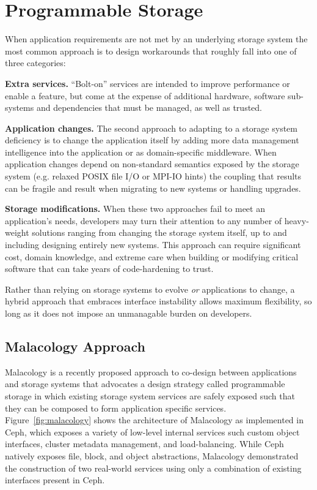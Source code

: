 \section{Programmable Storage}
\label{sec:progly}

When application requirements are not met by an underlying storage system the
most common approach is to design workarounds that roughly fall into one
of three categories:

{\bf Extra services.} ``Bolt-on'' services are intended to improve performance
or enable a feature, but come at the expense of additional hardware, software
sub-systems and dependencies that must be managed, as well as trusted.

{\bf Application changes.} The second approach to adapting to a storage system
deficiency is to change the application itself by adding more data management
intelligence into the application or as domain-specific middleware. When
application changes depend on non-standard semantics exposed by the storage
system (e.g. relaxed POSIX file I/O or MPI-IO hints) the coupling that results
can be fragile and result when migrating to new systems or handling upgrades.

{\bf Storage modifications.} When these two approaches fail to meet an
application's needs, developers may turn their attention to any number of
heavy-weight solutions ranging from changing the storage system itself, up to
and including designing entirely new systems. This approach can require
significant cost, domain knowledge, and extreme care when building or
modifying critical software that can take years of code-hardening to trust.

Rather than relying on storage systems to evolve \emph{or} applications to
change, a hybrid approach that embraces interface instability allows maximum
flexibility, so long as it does not impose an unmanagable burden on
developers.

\subsection{Malacology Approach}

Malacology is a recently proposed approach to co-design between applications
and storage systems that advocates a design strategy called programmable
storage in which existing storage system services are safely exposed such that
they can be composed to form application specific services.
Figure~\ref{fig:malacology} shows the architecture of Malacology as
implemented in Ceph, which exposes a variety of low-level internal services
such custom object interfaces, cluster metadata management, and
load-balancing. While Ceph natively exposes file, block, and object
abstractions, Malacology demonstrated the construction of two real-world
services using only a combination of existing interfaces present in Ceph.

